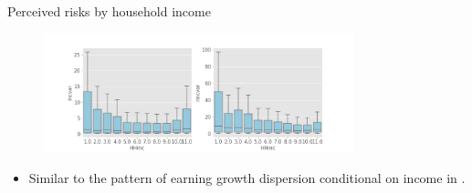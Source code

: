 \documentclass{beamer}
\begin{document}
\begin{frame}{Perceived risks by household income}
\begin{figure}
	\centering
	\label{boxplot_hhinc}
	\includegraphics[width=0.8\textwidth]{figures/boxplot_var_HHinc}
\end{figure}
	\begin{itemize}
	\item Similar to the pattern of earning growth dispersion conditional on income in \cite{bloom2018great}. 
\end{itemize}
\end{frame}
\end{document}
